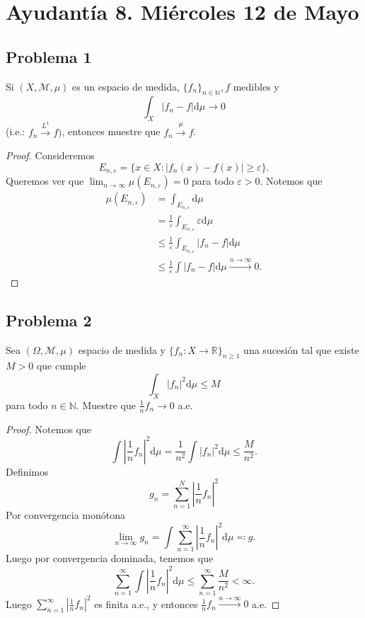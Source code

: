 \documentclass{article}
\theoremstyle{definition}
\theoremstyle{remark}
\numberwithin{equation}{section}
\newcommand{\M}{\mathcal{M}}
\newcommand{\N}{\mathbb{N}}
\newcommand{\R}{\mathbb{R}}
\renewcommand{\d}{\mathrm{d}}
\newcommand{\e}{\varepsilon}
\newcommand{\oo}{\infty}
\newcommand{\abs}[1]{\left| #1 \right|}
\newcommand{\ds}{\displaystyle}
\begin{document}
\newpage
\section{Ayudantía 8. Miércoles 12 de Mayo}

\subsection{Problema 1}
Si $(X,\M,\mu)$ es un espacio de medida, $\{f_n\}_{n\in\N}, f$ medibles y 
\[ \int_X \abs{f_n - f} \d\mu \to 0 \]
(i.e.: $f_n \xrightarrow{L^1} f)$, entonces muestre que $f_n \xrightarrow{\mu} f$.

\begin{proof}
  Consideremos
  \[ E_{n,\e} = \{x \in X \colon \abs{f_n(x) - f(x)} \geq \e\}. \]
  Queremos ver que $\lim_{n\to\oo} \mu(E_{n,\e}) = 0$ para todo $\e>0$.
  Notemos que 
  \begin{align*}
      \mu(E_{n,\e}) &= \int_{E_{n,\e}} \d\mu \\
      &= \frac1\e \int_{E_{n,\e}} \e \d\mu \\
      &\leq \frac1\e \int_{E_{n,\e}} \abs{f_n - f} \d\mu \\
      &\leq \frac1\e \int \abs{f_n - f} \d\mu \xrightarrow{n\to\oo} 0.
  \end{align*}
\end{proof}

\newpage
\subsection{Problema 2}

Sea $(\Omega,\M,\mu)$ espacio de medida y $\{f_n \colon X \to \R\}_{n\geq1}$ una sucesión tal que existe $M>0$ que cumple 
\[ \int_X \abs{f_n}^2 \d\mu \leq M \]
para todo $n \in \N$. Muestre que $\ds \frac1n f_n \to 0$ a.e.

\begin{proof}
  Notemos que 
  \[ \int \abs{\frac{1}{n} f_n}^2 \d\mu = \frac{1}{n^2} \int \abs{f_n}^2 \d\mu \leq \frac{M}{n^2}. \]
  Definimos 
  \[ g_n = \sum_{n=1}^N \abs{\frac{1}{n} f_n}^2 \]
  Por convergencia monótona 
  \[ \lim_{n\to\oo} g_n = \int \sum_{n=1}^\oo \abs{\frac{1}{n} f_n}^2 \d\mu \eqqcolon g. \]
  Luego por convergencia dominada, tenemos que 
  \[ \sum_{n=1}^\oo \int \abs{\frac{1}{n} f_n}^2 \d\mu \leq \sum_{n=1}^\oo \frac{M}{n^2} < \oo. \]
  Luego $\ds \sum_{n=1}^\oo \abs{\frac{1}{n} f_n}^2$ es finita a.e., y entonces $\ds \frac{1}{n} f_n \xrightarrow{n\to\oo} 0$ a.e.
\end{proof}
\end{document}
